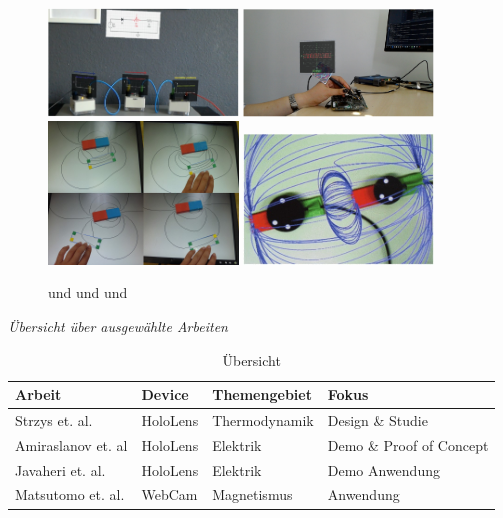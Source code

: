 \begin{figure}[h!]
	\centering
	\includegraphics[width=0.45\textwidth]{images/Amiraslanov18.png}
	\hspace{0.05cm}
	\includegraphics[width=0.45\textwidth]{images/Javaheri18.png}
	\vspace{0.05cm}
	\includegraphics[width=0.45\textwidth]{images/Matsutomo13.jpg}
	\hspace{0.05cm}
	\includegraphics[width=0.45\textwidth]{images/Mannuss11.jpg}
	\caption{\cite{Amiraslanov18} und \cite{Javaheri18} und \cite{Matsutomo13} und \cite{Mannuss11}}
	\label{img:paper-collection}
\end{figure}

\vspace{4px}
\textit{Übersicht über ausgewählte Arbeiten}\\
\setlength\extrarowheight{2pt}
\begin{table}[htb]
	\centering
	\begin{tabular}{l|l|l|l}
		Arbeit & Device & Themengebiet & Fokus\\
		\hline
		\hline
		Strzys et. al. & HoloLens & Thermodynamik & Design \& Studie\\
		\hline
		Amiraslanov et. al & HoloLens & Elektrik & Demo \& Proof of Concept\\
		\hline
		Javaheri et. al. & HoloLens & Elektrik & Demo Anwendung\\
		\hline
		Matsutomo et. al. & WebCam & Magnetismus & Anwendung\\
	\end{tabular}\caption{\label{tab:comparioson} Übersicht}
\end{table}

